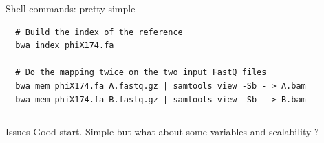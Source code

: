 \documentclass{beamer}
\begin{document}
\begin{frame}
\begin{columns}
\begin{column}[T]{9cm}
\begin{block}{Shell commands: pretty simple}
\begin{lstlisting}
  # Build the index of the reference
  bwa index phiX174.fa
  
  # Do the mapping twice on the two input FastQ files
  bwa mem phiX174.fa A.fastq.gz | samtools view -Sb - > A.bam
  bwa mem phiX174.fa B.fastq.gz | samtools view -Sb - > B.bam
  \end{lstlisting}                                                      
  \end{block}
 \end{column}
 \end{columns}
 
 \pause
  \begin{alertblock}{Issues}
  Good start. Simple but what about some variables and scalability ?
  \end{alertblock}
 
\end{frame}


\end{document}
